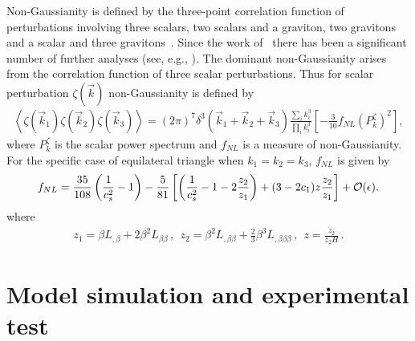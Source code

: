 \documentclass[a4paper,11pt]{article}
\begin{document}

  Non-Gaussianity is defined by the three-point correlation function of perturbations involving
  three scalars, two scalars and a graviton, two gravitons and a scalar and three gravitons~\cite{Maldacena:2002vr}.
  Since the work of~\cite{Maldacena:2002vr}  there has been
  a significant number of further analyses (see, e.g., \cite{Acquaviva:2002ud,Creminelli:2003iq,
  Silverstein:2003hf,Gruzinov:2004jx,Alishahiha:2004eh,Chen:2005fe,Creminelli:2005hu,
  Seery:2005wm,Babich:2004gb,Lyth:2005fi,Chen:2006nt, Huang:2007hh,Langlois:2008wt}).
  The dominant non-Gaussianity
  arises from the correlation function of three scalar perturbations. Thus for scalar perturbation $\zeta(\vec k)$ non-Gaussianity
  is defined by
  \begin{align}
    \left< \zeta(\vec k_1) \zeta(\vec k_2) \zeta(\vec k_3) \right> = (2\pi)^7 \delta^3(\vec k_1+ \vec k_2+ \vec k_3) \frac{\sum_i k_i^3}{\prod_i k_i^3}
    \left[ -\frac{3}{10} f_{NL} (P_k^{\zeta})^2 \right],
  \end{align}
  where $P_k^{\zeta}$ is the scalar power spectrum and $f_{NL}$ is a measure of non-Gaussianity. For the specific case of equilateral triangle
  when $k_1=k_2=k_3$, $f_{NL}$ is given by~\cite{Chen:2006nt}
  \begin{align}
    f_{NL}= \frac{35}{108}\left(\frac{1}{c_s^2}-1\right) - \frac{5}{81} \left[ \left(\frac{1}{c_s^2} -1- 2\frac{z_2}{z_1}\right) + (3-2 {c}_1)z \frac{z_2}{z_1}\right] + {\cal O}(\epsilon).
  \end{align}
  where
  \begin{align}
    z_1= \beta L_{,\beta} + 2 \beta^2 L_{\beta\beta}\,,~~
    z_2= \beta^2 L_{,\beta \beta} + \frac{2}{3} \beta^3 L_{,\beta\beta\beta}\,,~~
    z= \frac{\dot z_2}{z_2 H}\,.
  \end{align}

\section{Model simulation and experimental test \label{sec6}}
\end{document}
